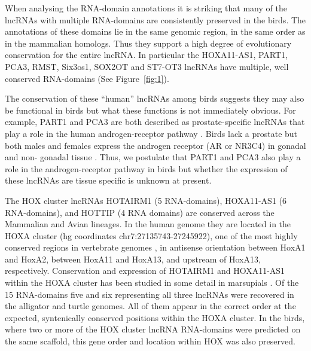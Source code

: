 \documentclass[10pt]{bmc_article}
\newenvironment{bmcformat}{\begin{raggedright}\baselineskip20pt\sloppy\setboolean{publ}{false}}{\end{raggedright}\baselineskip20pt\sloppy}
\begin{document}
\begin{bmcformat}
When analysing the RNA-domain annotations it is striking that many of
the lncRNAs with multiple RNA-domains are consistently preserved in
the birds. The annotations of these domains lie in the same genomic
region, in the same order as in the mammalian homologs. Thus they
support a high degree of evolutionary conservation for the entire
lncRNA. In particular the HOXA11-AS1, PART1, PCA3, RMST, Six3os1, SOX2OT and
ST7-OT3 lncRNAs have multiple, well conserved RNA-domains (See
Figure~\ref{fig:1}).

The conservation of these ``human'' lncRNAs among birds suggests they may 
also be functional in birds but what these
functions is not immediately obvious. For example, PART1 and
PCA3 are both described as prostate-specific lncRNAs that play a role
in the human androgen-receptor pathway
\cite{Bussemakers:1999,Lin:2000,Ferreira:2012}. Birds lack a prostate
but both males and females express the androgen receptor (AR or NR3C4) in gonadal
and non- gonadal tissue
\cite{Yoshimura:1993,Veney:2004,Fuxjager:2012,Leska:2012}. Thus, we
postulate that PART1 and PCA3 also play a role in the
androgen-receptor pathway in birds but whether the expression of these
lncRNAs are tissue specific is unknown at present.

The HOX cluster lncRNAs HOTAIRM1 (5 RNA-domains), HOXA11-AS1 (6
RNA-domains), and HOTTIP (4 RNA domains) are conserved across the
Mammalian and Avian lineages. In the human genome they are located in
the HOXA cluster (hg coordinates chr7:27135743-27245922), one of the
most highly conserved regions in vertebrate genomes
\cite{PascualAnaya:13}, in antisense orientation between HoxA1 and
HoxA2, between HoxA11 and HoxA13, and upstream of HoxA13,
respectively. Conservation and expression of HOTAIRM1 and HOXA11-AS1
within the HOXA cluster has been studied in some detail in marsupials
\cite{Yu:12}.  Of the 15 RNA-domains five and six representing all
three lncRNAs were recovered in the alligator and turtle genomes. All
of them appear in the correct order at the expected, syntenically
conserved positions within the HOXA cluster.  In the birds, where two
or more of the HOX cluster lncRNA RNA-domains were predicted on the
same scaffold, this gene order and location within HOX was also
preserved.



\end{bmcformat}
\end{document}
